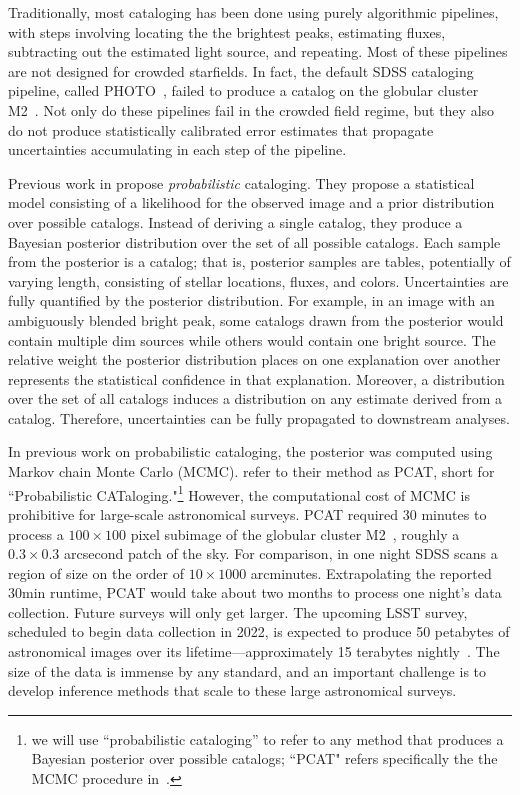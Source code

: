 Traditionally, most cataloging has been done using purely algorithmic pipelines, with steps involving locating the the brightest peaks, estimating fluxes, subtracting out the estimated light source, and repeating. 
Most of these pipelines are not designed for crowded starfields.
In fact, the default SDSS cataloging pipeline, called PHOTO~\cite{lupton2001sdss}, failed to 
produce a catalog on 
the globular cluster M2~\cite{Portillo_2017}. 
Not only do these pipelines fail in the crowded field
regime, but they also do not produce statistically calibrated error estimates that propagate 
uncertainties accumulating in each step of the pipeline. 

Previous work in \cite{Brewer_2013, Portillo_2017, Feder_2019}
propose {\itshape probabilistic} cataloging.
They propose a statistical model consisting of a likelihood for the observed image and a prior distribution over possible catalogs. Instead of deriving a single catalog, they produce a Bayesian posterior distribution over the set of all possible catalogs. 
Each sample from the posterior is a catalog; that is, posterior samples are tables, potentially of varying length, consisting of stellar locations, fluxes, and colors. 
Uncertainties are fully quantified by the posterior distribution. 
For example, in an image with an ambiguously blended bright peak, some catalogs drawn from the posterior would contain multiple dim sources while others would contain one bright source. 
The relative weight the posterior distribution places on one explanation over another represents the statistical confidence in that explanation. 
Moreover, a distribution over the set of all catalogs induces a distribution on any estimate derived from a catalog. Therefore, uncertainties can be fully propagated to downstream analyses.  

In previous work on probabilistic cataloging, the posterior was computed using Markov chain Monte Carlo (MCMC).
\cite{Portillo_2017, Feder_2019} refer to their method as PCAT, short for ``Probabilistic CATaloging."\footnote{
we will 
use ``probabilistic cataloging'' to refer to any method that produces a Bayesian posterior over possible catalogs; ``PCAT" refers specifically the the MCMC procedure in~\cite{Portillo_2017, Feder_2019}. }
However, the computational cost of MCMC is prohibitive for large-scale astronomical surveys. 
PCAT required 30 minutes to process a $100\times 100$ pixel subimage of the globular cluster M2~\cite{Feder_2019}, roughly a $0.3\times0.3$ arcsecond patch of the sky.
For comparison, in one night SDSS scans a region of size on the order of $10 \times 1000$ arcminutes. Extrapolating the reported 30min runtime, PCAT would take about two months to process one night's data collection.
Future surveys will only get larger. 
The upcoming LSST survey, scheduled to begin data collection in 2022, is expected to produce 50 petabytes of astronomical images over its lifetime---approximately 15 terabytes nightly~\cite{LSST_about}. 
The size of the data is immense by any standard, and an important challenge is to develop inference methods that scale to these large astronomical surveys. 


